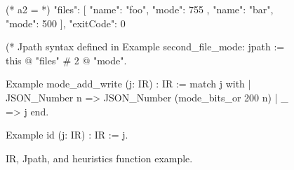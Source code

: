 \begin{figure}
  \begin{minipage}[t]{.4\textwidth}
\begin{json}
  (* a2 = *)
  {
    "files": [
      {
        "name": "foo",
        "mode": 755
      },
      {
        "name": "bar",
        "mode": 500
      }
    ],
    "exitCode": 0
  }
\end{json}
  \end{minipage}\begin{minipage}[t]{.5\textwidth}
\begin{coq}
(* Jpath syntax defined in %
Example second_file_mode: jpath :=
  this @ "files" # 2 @ "mode".

Example mode_add_write (j: IR) : IR :=
  match j with
  | JSON_Number n =>
    JSON_Number (mode_bits_or 200 n)
  | _ => j
  end.

Example id (j: IR) : IR := j.
\end{coq}
  \end{minipage}
  \caption{IR, Jpath, and heuristics function example.}
  \label{fig:ir-jpath}
\end{figure}

